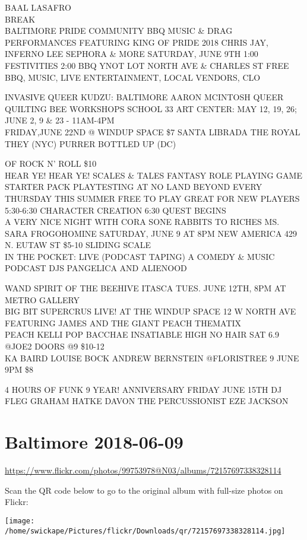 \documentclass[10pt,letterpaper]{article}
\begin{document}
BAAL LASAFRO\\
BREAK\\
BALTIMORE PRIDE COMMUNITY BBQ MUSIC \& DRAG PERFORMANCES FEATURING KING OF PRIDE 2018 CHRIS JAY, INFERNO LEE SEPHORA \& MORE SATURDAY, JUNE 9TH 1:00 FESTIVITIES 2:00 BBQ YNOT LOT NORTH AVE \& CHARLES ST FREE BBQ, MUSIC, LIVE ENTERTAINMENT, LOCAL VENDORS, CLO

INVASIVE QUEER KUDZU: BALTIMORE AARON MCINTOSH QUEER QUILTING BEE WORKSHOPS SCHOOL 33 ART CENTER: MAY 12, 19, 26; JUNE 2, 9 \& 23 {-} 11AM{-}4PM\\
FRIDAY,JUNE 22ND @ WINDUP SPACE \$7 SANTA LIBRADA THE ROYAL THEY (NYC) PURRER BOTTLED UP (DC)

OF ROCK N' ROLL \$10\\
HEAR YE!  HEAR YE!  SCALES \& TALES FANTASY ROLE PLAYING GAME STARTER PACK PLAYTESTING AT NO LAND BEYOND EVERY THURSDAY THIS SUMMER FREE TO PLAY GREAT FOR NEW PLAYERS 5:30{-}6:30 CHARACTER CREATION 6:30 QUEST BEGINS\\
A VERY NICE NIGHT WITH CORA SONE RABBITS TO RICHES MS. SARA FROGOHOMINE SATURDAY, JUNE 9 AT 8PM NEW AMERICA 429 N. EUTAW ST \$5{-}10 SLIDING SCALE\\
IN THE POCKET: LIVE (PODCAST TAPING) A COMEDY \& MUSIC PODCAST DJS PANGELICA AND ALIENOOD

WAND SPIRIT OF THE BEEHIVE ITASCA TUES. JUNE 12TH, 8PM AT METRO GALLERY\\
BIG BIT SUPERCRUS LIVE! AT THE WINDUP SPACE 12 W NORTH AVE FEATURING JAMES AND THE GIANT PEACH THEMATIX\\
PEACH KELLI POP BACCHAE INSATIABLE HIGH NO HAIR SAT 6.9 @JOE2 DOORS @9 \$10{-}12\\
KA BAIRD LOUISE BOCK ANDREW BERNSTEIN @FLORISTREE 9 JUNE 9PM \$8

4 HOURS OF FUNK 9 YEAR! ANNIVERSARY FRIDAY JUNE 15TH DJ FLEG GRAHAM HATKE DAVON THE PERCUSSIONIST EZE JACKSON
\pagebreak

\section*{Baltimore 2018-06-09}

\url{https://www.flickr.com/photos/99753978@N03/albums/72157697338328114}

Scan the QR code below to go to the original album with full-size photos on Flickr:

\texttt{[image: /home/swickape/Pictures/flickr/Downloads/qr/72157697338328114.jpg]}
\pagebreak
\end{document}

